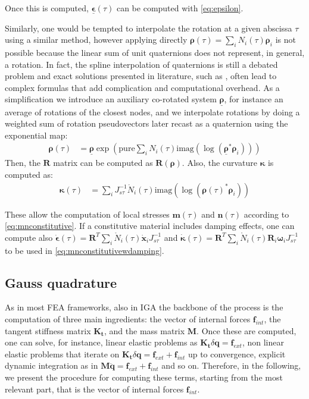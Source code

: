 \documentclass[review]{elsarticle}
\def\avect#1{{\boldsymbol{#1}}}
\def\amatr#1{{\boldsymbol{#1}}}
\begin{document}
Once this is computed, $\underline{\avect{\epsilon}}(\tau)$ can be computed with \eqref{eq:epsilon}.

Similarly, one would be tempted to interpolate the rotation at a given abscissa $\tau$ using a similar method, however applying directly $\avect{\rho}(\tau)  = \sum_i N_i(\tau) \avect{\rho}_i$ is not possible because the linear sum of unit quaternions does not represent, in general, a rotation. In fact, the spline interpolation of quaternions is still a debated problem and exact solutions presented in literature, such as \cite{kim1995general,kim1995c}, often lead to complex formulas that add complication and computational overhead. As a simplification we introduce an auxiliary co-rotated system $\underline{\avect{\rho}}$, for instance an average of rotations of the closest nodes, and we interpolate rotations by doing a weighted sum of rotation pseudovectors %
later recast as a quaternion using the exponential map:
%
\begin{align}
\avect{\rho}(\tau)  &= \underline{\avect{\rho}} \exp \left( \text{pure} \sum_i N_i(\tau) \text{imag}(\log( \underline{\avect{\rho}}^* \avect{\rho}_i)) \right) 
\end{align}
%
Then, the $\amatr{R}$ matrix can be computed as $\amatr{R}(\avect{\rho})$.
%
Also, the curvature $\avect{\kappa}$ is computed as:
%
\begin{align}
\avect{\kappa}(\tau)  &=   \sum_i J^{-1}_{s\tau} \mathring{N}_i(\tau) \text{imag}( \log(\avect{\rho}(\tau)^* \avect{\rho}_i))
\end{align}

These allow the computation of local stresses $\avect{m}(\tau)$ and $\avect{n}(\tau)$ according to \eqref{eq:mnconstitutive}.
If a constitutive material includes damping effects, one can compute also
$\dot{\avect{\epsilon}}(\tau)= \amatr{R}^T \sum_i \mathring{N}_i(\tau) \dot{\avect{x}}_i  J^{-1}_{s\tau}$
and 
$\dot{\avect{\kappa}}(\tau) = \amatr{R}^{T} \sum_i \mathring{N}_i(\tau) \amatr{R}_i \avect{\omega}_i  J^{-1}_{s\tau}$ to be used in \eqref{eq:mnconstitutivewdamping}.


\subsection{Gauss quadrature}

As in most FEA frameworks, also in IGA the backbone of the process is the computation of three main ingredients: the vector of internal forces $\avect{f}_{int}$, the tangent stiffness matrix $\amatr{K_t}$, and the mass matrix $\amatr{M}$. Once these are computed, one can solve, for instance, linear elastic problems as $\amatr{K_t}\delta\avect{q}=\avect{f}_{ext}$, non linear elastic problems that iterate on $\amatr{K_t}\delta\avect{q}=\avect{f}_{ext}+\avect{f}_{int}$ up to convergence, explicit dynamic integration as in $\amatr{M}\ddot{\avect{q}}=\avect{f}_{ext}+\avect{f}_{int}$ and so on. 
Therefore, in the following, we present the procedure for computing these terms, starting from the most relevant part, that is the vector of internal forces $\avect{f}_{int}$.
\end{document}
